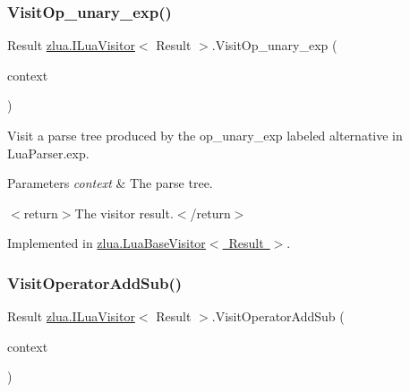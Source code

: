 \subsubsection{\texorpdfstring{Visit\+Op\+\_\+unary\+\_\+exp()}{VisitOp\_unary\_exp()}}
{\footnotesize\ttfamily Result \mbox{\hyperlink{interfacezlua_1_1_i_lua_visitor}{zlua.\+I\+Lua\+Visitor}}$<$ Result $>$.Visit\+Op\+\_\+unary\+\_\+exp (\begin{DoxyParamCaption}\item[{\mbox{[}\+Not\+Null\mbox{]} \mbox{\hyperlink{classzlua_1_1_lua_parser_1_1_op__unary__exp_context}{Lua\+Parser.\+Op\+\_\+unary\+\_\+exp\+Context}}}]{context }\end{DoxyParamCaption})}



Visit a parse tree produced by the {\ttfamily op\+\_\+unary\+\_\+exp} labeled alternative in Lua\+Parser.\+exp. 


\begin{DoxyParams}{Parameters}
{\em context} & The parse tree.\\
\hline
\end{DoxyParams}
$<$return$>$The visitor result.$<$/return$>$ 

Implemented in \mbox{\hyperlink{classzlua_1_1_lua_base_visitor_a36b016a0f996e60c5aa18d5d06394eb4}{zlua.\+Lua\+Base\+Visitor$<$ Result $>$}}.

\mbox{\label{interfacezlua_1_1_i_lua_visitor_a530f85828f02eb15078b452db78726a0}} 
\subsubsection{\texorpdfstring{Visit\+Operator\+Add\+Sub()}{VisitOperatorAddSub()}}
{\footnotesize\ttfamily Result \mbox{\hyperlink{interfacezlua_1_1_i_lua_visitor}{zlua.\+I\+Lua\+Visitor}}$<$ Result $>$.Visit\+Operator\+Add\+Sub (\begin{DoxyParamCaption}\item[{\mbox{[}\+Not\+Null\mbox{]} \mbox{\hyperlink{classzlua_1_1_lua_parser_1_1_operator_add_sub_context}{Lua\+Parser.\+Operator\+Add\+Sub\+Context}}}]{context }\end{DoxyParamCaption})}



